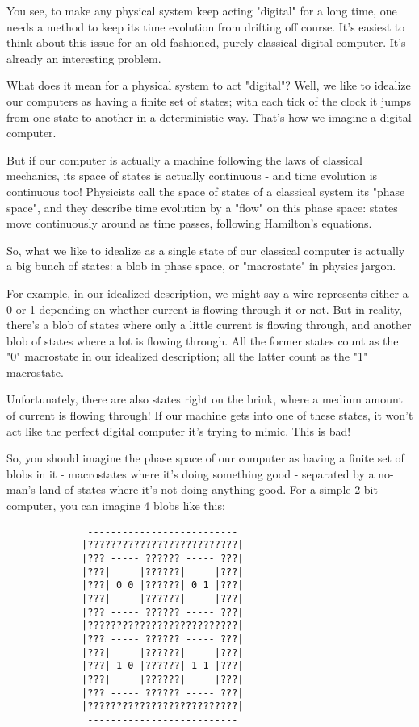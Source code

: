 You see, to make any physical system keep acting "digital" for a
long time, one needs a method to keep its time evolution from 
drifting off course.  It's easiest to think about this issue 
for an old-fashioned, purely classical digital computer.  It's 
already an interesting problem.  

What does it mean for a physical system to act "digital"?  Well,
we like to idealize our computers as having a finite set of states;
with each tick of the clock it jumps from one state to another in 
a deterministic way.  That's how we imagine a digital computer.

But if our computer is actually a machine following the laws of 
classical mechanics, its space of states is actually continuous - 
and time evolution is continuous too!  Physicists call the space 
of states of a classical system its "phase space", and they describe 
time evolution by a "flow" on this phase space: states move 
continuously around as time passes, following Hamilton's equations.

So, what we like to idealize as a single state of our classical
computer is actually a big bunch of states: a blob in phase space,
or "macrostate" in physics jargon.  

For example, in our idealized description, we might say a wire
represents either a 0 or 1 depending on whether current is 
flowing through it or not.  But in reality, there's a blob of 
states where only a little current is flowing through, and 
another blob of states where a lot is flowing through.  All 
the former states count as the "0" macrostate in our idealized 
description; all the latter count as the "1" macrostate.  

Unfortunately, there are also states right on the brink, where a 
medium amount of current is flowing through!  If our machine gets
into one of these states, it won't act like the perfect digital
computer it's trying to mimic.  This is bad!

So, you should imagine the phase space of our computer as having
a finite set of blobs in it - macrostates where it's doing something
good - separated by a no-man's land of states where it's not 
doing anything good.  For a simple 2-bit computer, you can imagine
4 blobs like this:

\begin{verbatim}
              --------------------------
             |??????????????????????????|
             |??? ----- ?????? ----- ???|
             |???|     |??????|     |???|
             |???| 0 0 |??????| 0 1 |???|
             |???|     |??????|     |???|
             |??? ----- ?????? ----- ???|
             |??????????????????????????|
             |??? ----- ?????? ----- ???|
             |???|     |??????|     |???|
             |???| 1 0 |??????| 1 1 |???|
             |???|     |??????|     |???|
             |??? ----- ?????? ----- ???|
             |??????????????????????????|
              --------------------------
\end{verbatim}
    
